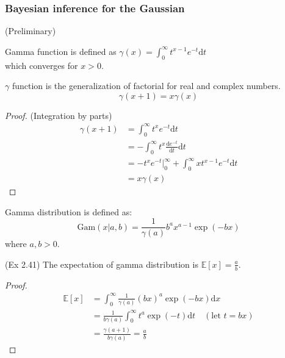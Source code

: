 \subsubsection{Bayesian inference for the Gaussian}
(Preliminary)
\begin{definition}
Gamma function is defined as $\gamma(x)=\int_{0}^{\infty}t^{x-1}e^{-t}\text{d}t$\\
which converges for $x>0$.
\end{definition}
\begin{conclusion}
$\gamma$ function is the generalization of factorial for real and complex numbers.
\begin{equation}
\gamma(x+1)=x\gamma(x)
\label{eqn:factorialgamma}
\end{equation}
\end{conclusion}
\begin{proof}
(Integration by parts) 
\begin{equation}
\begin{split}
\gamma(x+1)&=\int_{0}^{\infty}t^{x}e^{-t}\text{d}t\\
&=-\int_{0}^{\infty}t^{x}\frac{\text{d}e^{-t}}{\text{d}t}\text{d}t\\
&=-t^{x}e^{-t}\vert_{0}^{\infty}+\int_{0}^{\infty}xt^{x-1}e^{-t}\text{d}t\\
&=x\gamma(x)
\end{split}
\end{equation}
\end{proof}
\begin{definition}
Gamma distribution is defined as:
\begin{equation}
\text{Gam}(x\vert{}a,b)=\frac{1}{\gamma(a)}b^{a}x^{a-1}\exp{}(-bx)
\end{equation}
where $a,b>0$.
\end{definition}
\begin{conclusion}
(Ex 2.41) The expectation of gamma distribution is $\mathbb{E}[x]=\frac{a}{b}$.
\end{conclusion}
\begin{proof}
\begin{equation}
\begin{split}
\mathbb{E}[x]&=\int_{0}^{\infty}\frac{1}{\gamma(a)}(bx)^{a}\exp{}(-bx)\text{d}x\\
&=\frac{1}{b\gamma(a)}\int_{0}^{\infty}t^{a}\exp{}(-t)\text{d}t\quad{}(\text{let }t=bx)\\
&=\frac{\gamma(a+1)}{b\gamma(a)}=\frac{a}{b}
\end{split}
\end{equation}
\end{proof}
